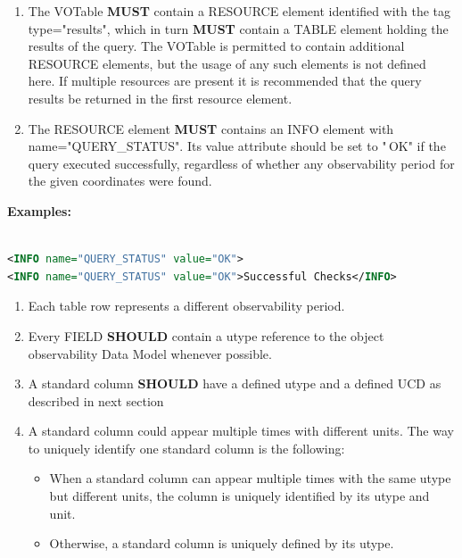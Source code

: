 \documentclass[11pt,a4paper]{ivoatex/ivoa}
\begin{document}
\begin{enumerate}
\item The VOTable \textbf{MUST} contain a RESOURCE element identified
with the tag type="results", which in turn \textbf{MUST} contain a TABLE 
element holding the results of the query. The VOTable is permitted to contain additional
RESOURCE elements, but the usage of any such elements is not defined
here. If multiple resources are present it is recommended that the query
results be returned in the first resource element.
\item The RESOURCE element \textbf{MUST} contains an INFO element with
name="QUERY\_STATUS". Its value attribute should be set to "\,OK" if the
query executed successfully, regardless of whether any observability period
for the given coordinates were found.
\setcounter{numberedCntBI}{\theenumi}
\end{enumerate}

\textbf{Examples: }
\begin{lstlisting}[language=XML]

<INFO name="QUERY_STATUS" value="OK">
<INFO name="QUERY_STATUS" value="OK">Successful Checks</INFO>
\end{lstlisting}

\begin{enumerate}
\setcounter{enumi}{\thenumberedCntBI}
\item Each table row represents a different observability period.
\item Every FIELD \textbf{SHOULD} contain a utype reference to the
object observability Data Model whenever possible.
\item A standard column \textbf{SHOULD} have a defined utype and a
defined UCD as described in next section
\item A standard column could appear multiple times with different
units. The way to uniquely identify one standard column is the
following:
\begin{itemize}
\item When a standard column can appear multiple times with the same
utype but different units, the column is uniquely identified by its
utype and unit.
\item Otherwise, a standard column is uniquely defined by its utype.
\end{itemize}
\setcounter{numberedCntBI}{\theenumi}
\end{enumerate}
\end{document}
